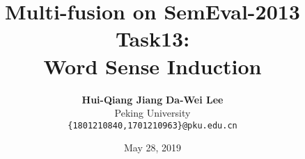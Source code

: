 \documentclass[12pt]{article}
\title{\textbf{Multi-fusion on SemEval-2013 Task13: \\ Word Sense Induction}}
\author{\textbf{Hui-Qiang Jiang} \quad \textbf{Da-Wei Lee} \\
Peking University \\
{\tt \{1801210840,1701210963\}@pku.edu.cn}}
\date{May 28, 2019}
\begin{document}
\maketitle
\begin{abstract}
  
\end{abstract}

\begin{multicols}{2}









\end{multicols}



\end{document}
